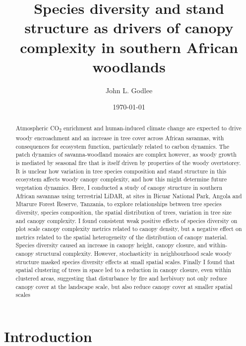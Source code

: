 \documentclass[11pt,a4paper]{article}
\title{Species diversity and stand structure as drivers of canopy complexity in southern African woodlands}
\author{John L. Godlee}
\date{\today}
\begin{document}
\maketitle{}

\linenumbers

\begin{abstract}
	Atmospheric CO\textsubscript{2} enrichment and human-induced climate change are expected to drive woody encroachment and an increase in tree cover across African savannas, with consequences for ecosystem function, particularly related to carbon dynamics. The patch dynamics of savanna-woodland mosaics are complex however, as woody growth is mediated by seasonal fire that is itself driven by properties of the woody overtstorey. It is unclear how variation in tree species composition and stand structure in this ecosystem affects woody canopy complexity, and how this might determine future vegetation dynamics. Here, I conducted a study of canopy structure in southern African savannas using terrestrial LiDAR, at sites in Bicuar National Park, Angola and Mtarure Forest Reserve, Tanzania, to explore relationships between tree species diversity, species composition, the spatial distribution of trees, variation in tree size and canopy complexity. I found consistent weak positive effects of species diversity on plot scale canopy complexity metrics related to canopy density, but a negative effect on metrics related to the spatial heterogeneity of the distribution of canopy material. Species diversity caused an increase in canopy height, canopy closure, and within-canopy structural complexity. However, stochasticity in neighbourhood scale woody structure masked species diversity effects at small spatial scales. Finally I found that spatial clustering of trees in space led to a reduction in canopy closure, even within clustered areas, suggesting that disturbance by fire and herbivory not only reduce canopy cover at the landscape scale, but also reduce canopy cover at smaller spatial scales 
\end{abstract}

\section{Introduction}
\end{document}
